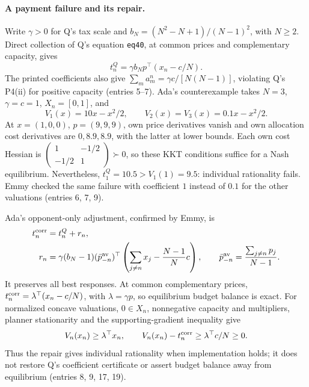 \documentclass{article}
\begin{document}
\paragraph{A payment failure and its repair.}
Write \(\gamma>0\) for Q's tax scale and
\(b_N=(N^2-N+1)/(N-1)^2\), with \(N\ge2\). Direct collection of Q's
equation \texttt{eq40}, at common prices and complementary capacity, gives
\[
 t_n^Q=\gamma b_N p^\top(x_n-c/N).
\]
The printed coefficients also give
\(\sum_m a_m^n=\gamma c/[N(N-1)]\), violating Q's P4(ii) for positive
capacity (entries 5--7). Ada's counterexample takes \(N=3\),
\(\gamma=c=1\), \(X_n=[0,1]\), and
\[
 V_1(x)=10x-x^2/2,\qquad V_2(x)=V_3(x)=0.1x-x^2/2.
\]
At \(x=(1,0,0)\), \(p=(9,9,9)\), own price derivatives vanish and own
allocation cost derivatives are \(0,8.9,8.9\), with the latter at lower
bounds. Each own cost Hessian is
\(\left(\begin{smallmatrix}1&-1/2\\-1/2&1\end{smallmatrix}\right)\succ0\),
so these KKT conditions suffice for a Nash equilibrium. Nevertheless,
\(t_1^Q=10.5>V_1(1)=9.5\): individual rationality fails. Emmy checked the
same failure with coefficient \(1\) instead of \(0.1\) for the other
valuations (entries 6, 7, 9).

Ada's opponent-only adjustment, confirmed by Emmy, is
\begin{align*}
 t_n^{\rm corr}&=t_n^Q+r_n,\\
 r_n&=\gamma(b_N-1)(\bar p_{-n}^{\rm av})^\top
 \left(\sum_{j\ne n}x_j-\frac{N-1}{N}c\right),\qquad
 \bar p_{-n}^{\rm av}=\frac{\sum_{j\ne n}p_j}{N-1}.
\end{align*}
It preserves all best responses. At common complementary prices,
\(t_n^{\rm corr}=\lambda^\top(x_n-c/N)\), with \(\lambda=\gamma p\),
so equilibrium budget balance is exact. For normalized concave valuations,
\(0\in X_n\), nonnegative capacity and multipliers, planner stationarity
and the supporting-gradient inequality give
\[
 V_n(x_n)\ge\lambda^\top x_n,\qquad
 V_n(x_n)-t_n^{\rm corr}\ge\lambda^\top c/N\ge0.
\]
Thus the repair gives individual rationality when implementation holds;
it does not restore Q's coefficient certificate or assert budget balance
away from equilibrium (entries 8, 9, 17, 19).
\end{document}
